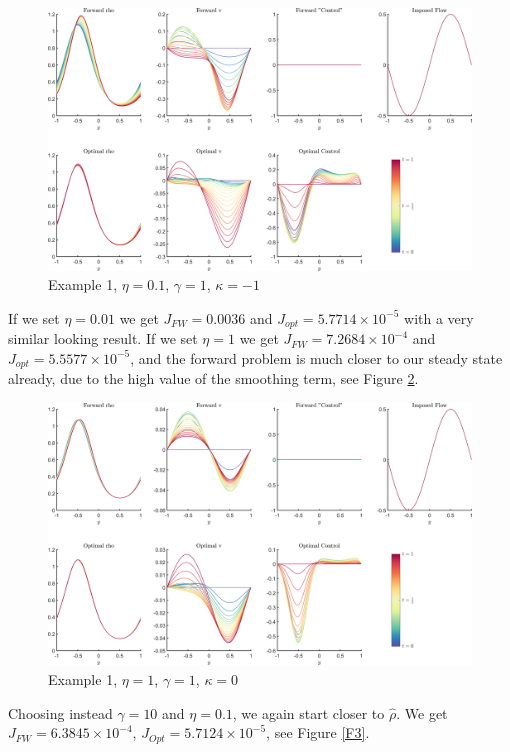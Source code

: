 \documentclass[11pt, a4paper]{article}
\theoremstyle{definition}
\begin{document}
\begin{figure}[h]
	\centering
	\includegraphics[scale=0.04]{Example11n1.png}
	\caption{Example 1, $\eta = 0.1$, $\gamma = 1$, $\kappa = -1$} 
	\label{F1b}
\end{figure}
	If we set $\eta = 0.01$ we get $J_{FW} = 0.0036$ and $J_{opt} = 5.7714 \times 10^{-5}$ with a very similar looking result.
	If we set $\eta = 1$ we get $J_{FW} = 7.2684 \times 10^{-4}$ and $J_{opt} = 5.5577 \times 10^{-5}$, and the forward problem is much closer to our steady state already, due to the high value of the smoothing term, see Figure \ref{F2}.
	\begin{figure}[h]
		\centering
		\includegraphics[scale=0.04]{Example1a.png}
		\caption{Example 1, $\eta = 1$, $\gamma = 1$, $\kappa = 0$} 
		\label{F2}
	\end{figure}
	Choosing instead $\gamma = 10$ and $\eta = 0.1$, we again start closer to $\widehat \rho$. We get $J_{FW} = 6.3845 \times 10^{-4}$, $J_{Opt} = 5.7124 \times 10^{-5}$, see Figure \ref{F3}.
\end{document}
